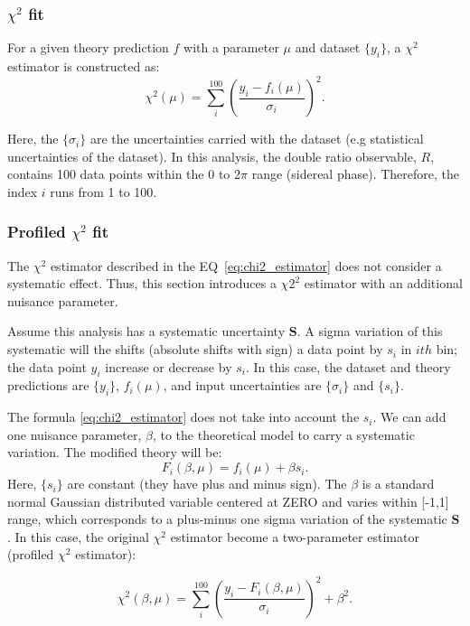 
\subsubsection{$\chi^{2}$ fit}
For a given theory prediction $f$ with a parameter $\mu$ and dataset $\{y_{i}\}$, a $\chi^{2}$ estimator is constructed as:
\begin{equation}
    \chi^{2} (\mu) = \sum_{i}^{100} \left(\frac{y_{i} - f_{i}(\mu)}{\sigma_{i}}\right)^{2}.
\end{equation}\label{eq:chi2_estimator}

Here, the $\{\sigma_{i}\}$ are the uncertainties carried with the dataset (e.g statistical uncertainties of the dataset). In this analysis, the double ratio observable, $R$, contains 100 data points within the 0 to $2\pi$ range (sidereal phase). Therefore, the index $i$ runs from 1 to 100. 

\subsubsection{Profiled $\chi^{2}$ fit}
The $\chi^{2}$ estimator described in the EQ~\ref{eq:chi2_estimator} does not consider a systematic effect. Thus, this section introduces a $\chi2^{2}$ estimator with an additional nuisance parameter.

Assume this analysis has a systematic uncertainty $\textbf{S}$.  A sigma variation of this systematic will the shifts (absolute shifts with sign) a data point by $s_{i}$ in $ith$ bin; the data point $y_{i}$ increase or decrease by $s_{i}$. In this case, the dataset and theory predictions are $\{y_{i}\}$, $f_{i}(\mu)$, and input uncertainties are $\{\sigma_{i}\}$ and $\{s_{i}\}$.

The formula \ref{eq:chi2_estimator} does not take into account the $s_{i}$. We can add one nuisance parameter, $\beta$, to the theoretical model to carry a systematic variation. The modified theory will be:
\begin{equation}
    F_{i}(\beta, \mu) = f_{i}(\mu) + \beta s_{i}.
\end{equation}\label{eq:modefied_func}
Here, $\{s_{i}\}$ are constant (they have plus and minus sign). The $\beta$ is a standard normal Gaussian distributed variable centered at ZERO and varies within [-1,1] range, which corresponds to a plus-minus one sigma variation of the systematic $\textbf{S}$. In this case, the original $\chi^{2}$ estimator become a two-parameter estimator (profiled $\chi^{2}$ estimator):

\begin{equation}
    \chi^{2} (\beta, \mu) = \sum_{i}^{100} \left(\frac{y_{i} - F_{i}(\beta, \mu)}{\sigma_{i}}\right)^{2} + \beta^{2}.
\end{equation}\label{eq:profile_chi2_estimator}


